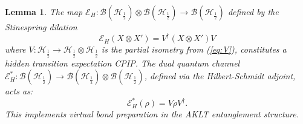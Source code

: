 \documentclass[12pt,a4paper]{article}
\newtheorem{lemma}[theorem]{Lemma}
\begin{document}
\begin{lemma}\label{lem:Eh}
  The map $\mathcal{E}_H: \mathcal{B}(\mathcal{H}_{\frac{1}{2}}) \otimes \mathcal{B}(\mathcal{H}_{\frac{1}{2}}) \to \mathcal{B}(\mathcal{H}_{\frac{1}{2}})$ defined by the Stinespring dilation
\begin{equation}\label{eq:EH}
\mathcal{E}_H(X \otimes X') = V^\dagger(X \otimes X')V
\end{equation}
where $V: \mathcal{H}_{\frac{1}{2}} \to \mathcal{H}_{\frac{1}{2}} \otimes \mathcal{H}_{\frac{1}{2}}$ is the partial isometry from (\ref{eq:V}), constitutes a hidden transition expectation CPIP.
The dual quantum channel $\mathcal{E}_H^*: \mathcal{B}(\mathcal{H}_{\frac{1}{2}}) \to \mathcal{B}(\mathcal{H}_{\frac{1}{2}}) \otimes \mathcal{B}(\mathcal{H}_{\frac{1}{2}})$, defined via the Hilbert-Schmidt adjoint, acts as:
\begin{equation}\label{eq:EH_dual}
\mathcal{E}_H^*(\rho) = V\rho V^\dagger.
\end{equation}
This implements virtual bond preparation in the AKLT entanglement structure.
\end{lemma}
\end{document}
